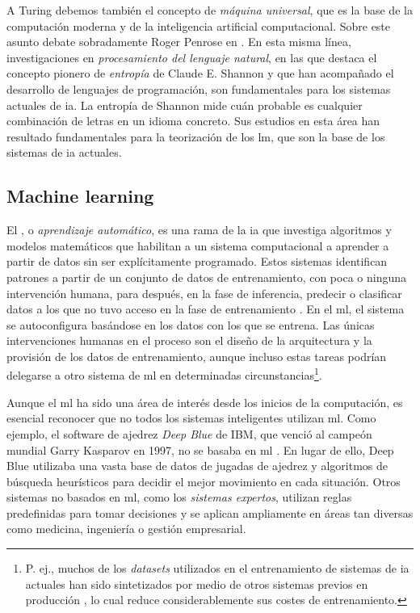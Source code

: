 
A Turing debemos también el concepto de \emph{máquina universal}, que es la base de la computación moderna y de la inteligencia artificial computacional. Sobre este asunto debate sobradamente Roger Penrose en \cite{penroseNuevaMenteEmperador2015}. En esta misma línea, investigaciones en \emph{procesamiento del lenguaje natural}, en las que destaca el concepto pionero de \emph{entropía} de Claude E. Shannon \citep{shannon1951prediction} y que han acompañado el desarrollo de lenguajes de programación, son fundamentales para los sistemas actuales de \gls{ia}. La entropía de Shannon mide cuán probable es cualquier combinación de letras en un idioma concreto. Sus estudios en esta área han resultado fundamentales para la teorización de los \gls{lm}, que son la base de los sistemas de \gls{ia} actuales.


\subsection{Machine learning}

El , o \emph{aprendizaje automático}, es una rama de la \gls{ia} que investiga algoritmos y modelos matemáticos que habilitan a un sistema computacional a aprender a partir de datos sin ser explícitamente programado. Estos sistemas identifican patrones a partir de un conjunto de datos de entrenamiento, con poca o ninguna intervención humana, para después, en la fase de inferencia, predecir o clasificar datos a los que no tuvo acceso en la fase de entrenamiento \citep{gollapudi2016practical}. En el \gls{ml}, el sistema se autoconfigura basándose en los datos con los que se entrena. Las únicas intervenciones humanas en el proceso son el diseño de la arquitectura y la provisión de los datos de entrenamiento, aunque incluso estas tareas podrían delegarse a otro sistema de \gls{ml} en determinadas circunstancias\footnote{P. ej., muchos de los \emph{datasets} utilizados en el entrenamiento de sistemas de \gls{ia} actuales han sido sintetizados por medio de otros sistemas previos en producción \citep{liSyntheticDataGeneration2023}, lo cual reduce considerablemente sus costes de entrenamiento.}.

Aunque el \gls{ml} ha sido una área de interés desde los inicios de la computación, es esencial reconocer que no todos los sistemas inteligentes utilizan \gls{ml}. Como ejemplo, el software de ajedrez \emph{Deep Blue} de IBM, que venció al campeón mundial Garry Kasparov en 1997, no se basaba en \gls{ml} \citep{campbellDeepBlue2002}. En lugar de ello, {Deep Blue} utilizaba una vasta base de datos de jugadas de ajedrez y algoritmos de búsqueda heurísticos para decidir el mejor movimiento en cada situación. Otros sistemas no basados en \gls{ml}, como los \emph{sistemas expertos}, utilizan reglas predefinidas para tomar decisiones y se aplican ampliamente en áreas tan diversas como medicina, ingeniería o gestión empresarial.


